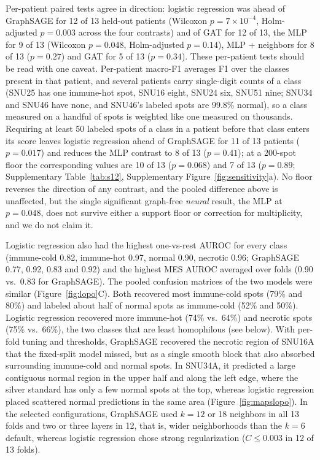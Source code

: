 \documentclass[11pt,letterpaper]{article}
\begin{document}
Per-patient paired tests agree in direction: logistic regression was ahead of GraphSAGE for 12 of 13 held-out patients (Wilcoxon $p = 7 \times 10^{-4}$, Holm-adjusted $p = 0.003$ across the four contrasts) and of GAT for 12 of 13, the MLP for 9 of 13 (Wilcoxon $p = 0.048$, Holm-adjusted $p = 0.14$), MLP + neighbors for 8 of 13 ($p = 0.27$) and GAT for 5 of 13 ($p = 0.34$). These per-patient tests should be read with one caveat. Per-patient macro-F1 averages F1 over the classes present in that patient, and several patients carry single-digit counts of a class (SNU25 has one immune-hot spot, SNU16 eight, SNU24 six, SNU51 nine; SNU34 and SNU46 have none, and SNU46's labeled spots are 99.8\% normal), so a class measured on a handful of spots is weighted like one measured on thousands. Requiring at least 50 labeled spots of a class in a patient before that class enters its score leaves logistic regression ahead of GraphSAGE for 11 of 13 patients ($p = 0.017$) and reduces the MLP contrast to 8 of 13 ($p = 0.41$); at a 200-spot floor the corresponding values are 10 of 13 ($p = 0.068$) and 7 of 13 ($p = 0.89$; Supplementary Table~\ref{tab:s12}, Supplementary Figure~\ref{fig:sensitivity}a). No floor reverses the direction of any contrast, and the pooled difference above is unaffected, but the single significant graph-free \emph{neural} result, the MLP at $p = 0.048$, does not survive either a support floor or correction for multiplicity, and we do not claim it.

Logistic regression also had the highest one-vs-rest AUROC for every class (immune-cold 0.82, immune-hot 0.97, normal 0.90, necrotic 0.96; GraphSAGE 0.77, 0.92, 0.83 and 0.92) and the highest MES AUROC averaged over folds (0.90 vs.\ 0.83 for GraphSAGE). The pooled confusion matrices of the two models were similar (Figure~\ref{fig:lopo}C). Both recovered most immune-cold spots (79\% and 80\%) and labeled about half of normal spots as immune-cold (52\% and 50\%). Logistic regression recovered more immune-hot (74\% vs.\ 64\%) and necrotic spots (75\% vs.\ 66\%), the two classes that are least homophilous (see below). With per-fold tuning and thresholds, GraphSAGE recovered the necrotic region of SNU16A that the fixed-split model missed, but as a single smooth block that also absorbed surrounding immune-cold and normal spots. In SNU34A, it predicted a large contiguous normal region in the upper half and along the left edge, where the silver standard has only a few normal spots at the top, whereas logistic regression placed scattered normal predictions in the same area (Figure~\ref{fig:mapslopo}). In the selected configurations, GraphSAGE used $k = 12$ or 18 neighbors in all 13 folds and two or three layers in 12, that is, wider neighborhoods than the $k = 6$ default, whereas logistic regression chose strong regularization ($C \le 0.003$ in 12 of 13 folds).
\end{document}
